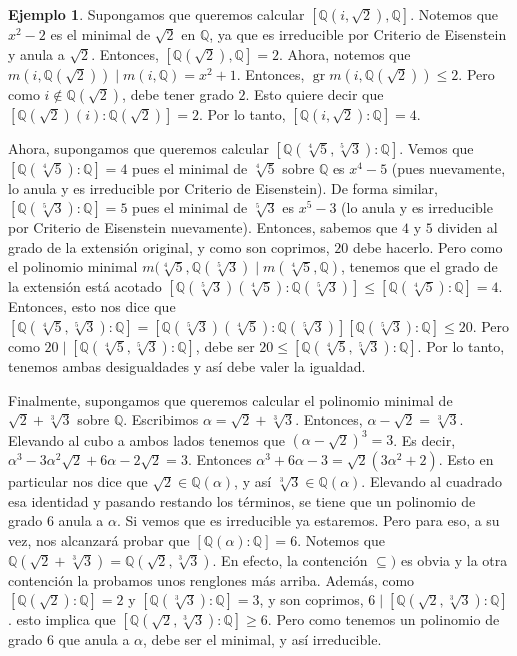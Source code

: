 \documentclass[12pt]{book}
\theoremstyle{definition}
\newtheorem{ex}[teo]{Ejemplo}
\newcommand{\QQ}{\mathbb{Q}}
\DeclareMathOperator{\gr}{gr}
\begin{document}
\begin{ex}
Supongamos que queremos calcular $[\QQ(i,\sqrt{2}),\QQ]$. Notemos que $x^2 -2$ es el minimal de $\sqrt{2}$ en $\QQ$, ya que es irreducible por Criterio de Eisenstein y anula a $\sqrt{2}$. Entonces, $[\QQ(\sqrt{2}),\QQ]=2$. Ahora, notemos que $m(i,\QQ(\sqrt{2})) \mid m(i,\QQ) = x^2 + 1$. Entonces, $\gr m(i,\QQ(\sqrt{2})) \leq 2$. Pero como $i\notin \QQ(\sqrt{2})$, debe tener grado $2$. Esto quiere decir que $[\QQ(\sqrt{2})(i):\QQ(\sqrt{2})] = 2$. Por lo tanto, $[\QQ(i,\sqrt{2}):\QQ]=4$.

Ahora, supongamos que queremos calcular $[\QQ(\sqrt[4]{5},\sqrt[5]{3}) : \QQ]$. Vemos que $[\QQ(\sqrt[4]{5}):\QQ]=4$ pues el minimal de $\sqrt[4]{5}$ sobre $\QQ$ es $x^4 - 5$ (pues nuevamente, lo anula y es irreducible por Criterio de Eisenstein). De forma similar, $[\QQ(\sqrt[5]{3}):\QQ]=5$ pues el minimal de $\sqrt[5]{3}$ es $x^5 - 3$ (lo anula y es irreducible por Criterio de Eisenstein nuevamente). Entonces, sabemos que $4$ y $5$ dividen al grado de la extensión original, y como son coprimos, $20$ debe hacerlo. Pero como el polinomio minimal $m(\sqrt[4]{5},\QQ(\sqrt[5]{3}) \mid m(\sqrt[4]{5},\QQ)$, tenemos que el grado de la extensión está acotado $[\QQ(\sqrt[5]{3})(\sqrt[4]{5}):\QQ(\sqrt[5]{3})]\leq [\QQ(\sqrt[4]{5}):\QQ]=4$. Entonces, esto nos dice que $[\QQ(\sqrt[4]{5},\sqrt[5]{3}) : \QQ] = [\QQ(\sqrt[5]{3})(\sqrt[4]{5}):\QQ(\sqrt[5]{3})] [\QQ(\sqrt[5]{3}):\QQ] \leq 20$. Pero como $20\mid [\QQ(\sqrt[4]{5},\sqrt[5]{3}) : \QQ]$, debe ser $20\leq [\QQ(\sqrt[4]{5},\sqrt[5]{3}) : \QQ]$. Por lo tanto, tenemos ambas desigualdades y así debe valer la igualdad.

Finalmente, supongamos que queremos calcular el polinomio minimal de $\sqrt{2}+\sqrt[3]{3}$ sobre $\QQ$. Escribimos $\alpha = \sqrt{2}+\sqrt[3]{3}$. Entonces, $\alpha-\sqrt{2} = \sqrt[3]{3}$. Elevando al cubo a ambos lados tenemos que $(\alpha-\sqrt{2})^3 = 3$. Es decir, $\alpha^3 - 3\alpha^2 \sqrt{2} + 6\alpha - 2\sqrt{2} = 3$. Entonces $\alpha^3 + 6\alpha - 3 = \sqrt{2}(3\alpha^2 + 2)$. Esto en particular nos dice que $\sqrt{2}\in\QQ(\alpha)$, y así $\sqrt[3]{3}\in\QQ(\alpha)$. Elevando al cuadrado esa identidad y pasando restando los términos, se tiene que un polinomio de grado $6$ anula a $\alpha$. Si vemos que es irreducible ya estaremos. Pero para eso, a su vez, nos alcanzará probar que $[\QQ(\alpha):\QQ]=6$. Notemos que $\QQ(\sqrt{2}+\sqrt[3]{3}) = \QQ(\sqrt{2},\sqrt[3]{3})$. En efecto, la contención $\subseteq)$ es obvia y la otra contención la probamos unos renglones más arriba. Además, como $[\QQ(\sqrt{2}):\QQ]= 2$ y $[\QQ(\sqrt[3]{3}):\QQ]=3$, y son coprimos, $6\mid [\QQ(\sqrt{2},\sqrt[3]{3}):\QQ]$. esto implica que $[\QQ(\sqrt{2},\sqrt[3]{3}):\QQ]\geq 6$. Pero como tenemos un polinomio de grado $6$ que anula a $\alpha$, debe ser el minimal, y así irreducible.

\end{ex}
\end{document}
